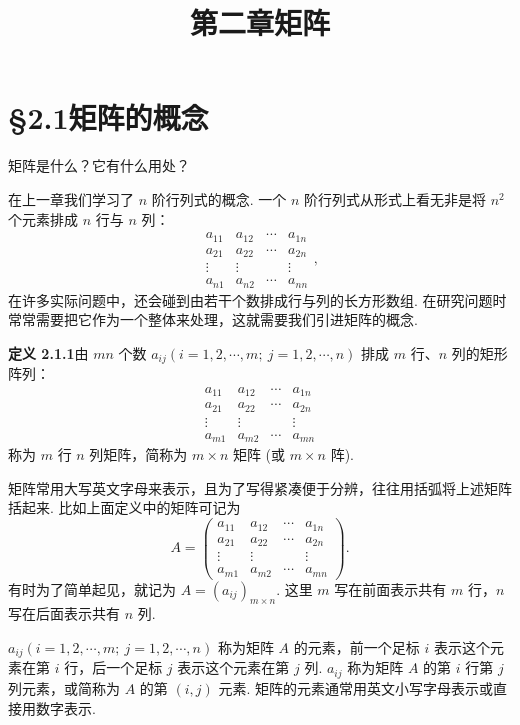 \documentclass[UTF8, 12pt, fontset=fandol, oneside]{ctexart}
\title{第二章\quad 矩阵}
\author{}
\date{}
\begin{document}
\maketitle

\section*{§2.1\quad 矩阵的概念}

矩阵是什么？它有什么用处？

在上一章我们学习了 $n$ 阶行列式的概念. 一个 $n$ 阶行列式从形式上看无非是将 $n^2$ 个元素排成 $n$ 行与 $n$ 列：
\[
\begin{array}{cccc}
a_{11} & a_{12} & \cdots & a_{1n}\\
a_{21} & a_{22} & \cdots & a_{2n}\\
\vdots & \vdots & & \vdots\\
a_{n1} & a_{n2} & \cdots & a_{nn}
\end{array},
\]
在许多实际问题中，还会碰到由若干个数排成行与列的长方形数组. 在研究问题时常常需要把它作为一个整体来处理，这就需要我们引进矩阵的概念.

\noindent\textbf{定义 2.1.1}\quad 由 $mn$ 个数 $a_{ij}(i=1,2,\cdots,m;\ j=1,2,\cdots,n)$ 排成 $m$ 行、$n$ 列的矩形阵列：
\[
\begin{array}{cccc}
a_{11} & a_{12} & \cdots & a_{1n}\\
a_{21} & a_{22} & \cdots & a_{2n}\\
\vdots & \vdots & & \vdots\\
a_{m1} & a_{m2} & \cdots & a_{mn}
\end{array}
\]
称为 $m$ 行 $n$ 列矩阵，简称为 $m\times n$ 矩阵 (或 $m\times n$ 阵).

矩阵常用大写英文字母来表示，且为了写得紧凑便于分辨，往往用括弧将上述矩阵括起来. 比如上面定义中的矩阵可记为
\[
A=
\left(\begin{array}{cccc}
a_{11} & a_{12} & \cdots & a_{1n}\\
a_{21} & a_{22} & \cdots & a_{2n}\\
\vdots & \vdots & & \vdots\\
a_{m1} & a_{m2} & \cdots & a_{mn}
\end{array}\right).
\]
有时为了简单起见，就记为 $A=(a_{ij})_{m\times n}$. 这里 $m$ 写在前面表示共有 $m$ 行，$n$ 写在后面表示共有 $n$ 列.

$a_{ij}(i=1,2,\cdots,m;\ j=1,2,\cdots,n)$ 称为矩阵 $A$ 的元素，前一个足标 $i$ 表示这个元素在第 $i$ 行，后一个足标 $j$ 表示这个元素在第 $j$ 列. $a_{ij}$ 称为矩阵 $A$ 的第 $i$ 行第 $j$ 列元素，或简称为 $A$ 的第 $(i,j)$ 元素. 矩阵的元素通常用英文小写字母表示或直接用数字表示.
\end{document}
